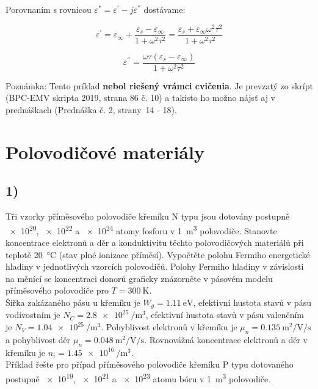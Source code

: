 Porovnaním s rovnicou ${\varepsilon^{*}}={\varepsilon^{'}}-{j\varepsilon^{''}}$ dostávame:

\begin{equation*}
    {\varepsilon^{'}}={\varepsilon_\infty}+\frac{{\varepsilon_s}-{\varepsilon_\infty}}{1+{\omega}^2{\tau}^2}=\frac{{\varepsilon_s}+{\varepsilon_\infty}{\omega}^2{\tau}^2}{1+{\omega}^2{\tau}^2} \tag{Reálna časť}
\end{equation*}

\begin{equation*}
    {\varepsilon^{''}}=\frac{\omega\tau({\varepsilon_s}-{\varepsilon_\infty})}{1+{\omega}^2{\tau}^2} \tag{Imaginárna časť}
\end{equation*}

\color{red}Poznámka: Tento príklad \textbf{nebol riešený vrámci cvičenia}. Je prevzatý zo skrípt (BPC-EMV skripta 2019, strana 86 č. 10) a takisto ho možno nájsť aj v prednáškach (Prednáška č. 2, strany~14 - 18). \\

\color{black}

\newpage


\section{Polovodičové materiály}

\subsection*{1)}

Tři vzorky příměsového polovodiče křemíku N typu jsou dotovány postupně \SI{e20}{}, \SI{e22}{} a \SI{e24}{} atomy fosforu v \SI{1}{\cubic\meter} polovodiče. Stanovte koncentrace elektronů a děr a konduktivitu těchto polovodičových materiálů při teplotě \SI{20}{\degreeCelsius} (stav plné ionizace příměsí). Vypočtěte polohu Fermiho energetické hladiny v jednotlivých vzorcích polovodičů. Polohy Fermiho hladiny v závislosti na měnící se koncentraci donorů graficky znázorněte v pásovém modelu příměsového polovodiče pro $T=\SI{300}{\kelvin}$. \\
Šířka zakázaného pásu u křemíku je $W_g = \SI{1,11}{\electronvolt}$, efektivní hustota stavů v pásu vodivostním je $N_C = \SI{2,8e25}{\per\cubic\meter}$, efektivní hustota stavů v pásu valenčním je $N_V = \SI{1,04e25}{\per\cubic\meter}$. \break 
Pohyblivost elektronů v křemíku je $\mu_n = \SI{0,135}{\meter\squared\per\volt\per\second}$ a pohyblivost děr $\mu_n = \SI{0,048}{\meter\squared\per\volt\per\second}$. Rovnovážná koncentrace elektronů a děr v křemíku je $n_i = \SI{1,45e16}{\per\cubic\meter}$. \\
Příklad řešte pro případ příměsového polovodiče křemíku P typu dotovaného postupně \break \SI{e19}{}, \SI{e21}{} a \SI{e23}{} atomu bóru v \SI{1}{\cubic\meter} polovodiče.

